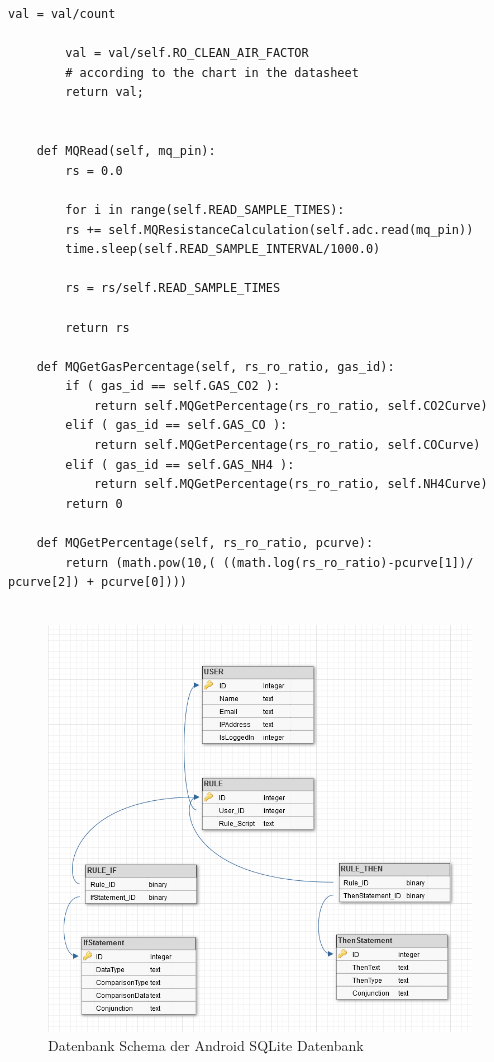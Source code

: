 \begin{lstlisting}[label=list:MQClass, caption={Auswertung der MQ-Sensorwerte}]
		val = val/count                                         
	
		val = val/self.RO_CLEAN_AIR_FACTOR                     
		# according to the chart in the datasheet 
		return val;
	
	
	def MQRead(self, mq_pin):
		rs = 0.0
		
		for i in range(self.READ_SAMPLE_TIMES):
		rs += self.MQResistanceCalculation(self.adc.read(mq_pin))
		time.sleep(self.READ_SAMPLE_INTERVAL/1000.0)
		
		rs = rs/self.READ_SAMPLE_TIMES
		
		return rs
	
	def MQGetGasPercentage(self, rs_ro_ratio, gas_id):
		if ( gas_id == self.GAS_CO2 ):
			return self.MQGetPercentage(rs_ro_ratio, self.CO2Curve)
		elif ( gas_id == self.GAS_CO ):
			return self.MQGetPercentage(rs_ro_ratio, self.COCurve)
		elif ( gas_id == self.GAS_NH4 ):
			return self.MQGetPercentage(rs_ro_ratio, self.NH4Curve)
		return 0

	def MQGetPercentage(self, rs_ro_ratio, pcurve):
		return (math.pow(10,( ((math.log(rs_ro_ratio)-pcurve[1])/ pcurve[2]) + pcurve[0])))
	

\end{lstlisting}
\newpage
\begin{figure}
	\centering
	\includegraphics[width=1\textwidth]{images/DBSchema.png}
	\caption{Datenbank Schema der Android SQLite Datenbank}
	\label{fig:androiddbschema}
\end{figure}